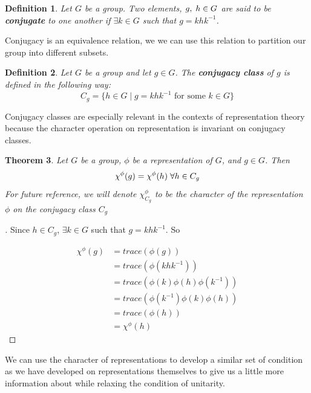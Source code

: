 \documentclass[10pt]{ucthesis}
\newtheorem{definition}{Definition}[chapter]
\newtheorem{theorem}[definition]{Theorem}
\begin{document}
\begin{definition}
	Let $G$ be a group. Two elements, $g,\hspace{1mm}h \in G$ are said to be \textbf{conjugate} to one another if $\exists k \in G$ such that $g = khk^{-1}$.
\end{definition}

Conjugacy is an equivalence relation, we we can use this relation to partition our group into different subsets.

\begin{definition}
	Let $G$ be a group and let $g \in G$. The \textbf{conjugacy class} of $g$ is defined in the following way:
$$C_g = \{h\in G \mid g = khk^{-1} \text{ for some } k \in G \}$$
\end{definition}

Conjugacy classes are especially relevant in the contexts of representation theory because the character operation on representation is invariant on conjugacy classes.

\begin{theorem}
	Let $G$ be a group, $\phi$ be a representation of $G$, and $g\in G$. Then 
$$\chi^\phi(g) = \chi^\phi(h) \hspace{1mm}\forall h \in C_g$$
For future reference, we will denote $\chi^\phi_{C_g}$ to be the character of the representation $\phi$ on the conjugacy class $C_g$
\end{theorem}
\begin{proof}[\cite{Mendes}] Since $h\in C_g$, $\exists k\in G$ such that $g = khk^{-1}$. So 

\begin{equation}
	\begin{aligned}
		\chi^\phi(g) &= trace(\phi(g)) \\
					&= trace(\phi(khk^{-1}))\\ 
					&= trace(\phi(k)\phi(h)\phi(k^{-1})) \\
					&= trace(\phi(k^{-1})\phi(k)\phi(h)) \\
					&= trace(\phi(h)) \\
					&= \chi^\phi(h) 
	\end{aligned}
\end{equation}
\end{proof}

We can use the character of representations to develop a similar set of condition as we have developed on representations themselves to give us a little more information about while relaxing the condition of unitarity.
\end{document}
